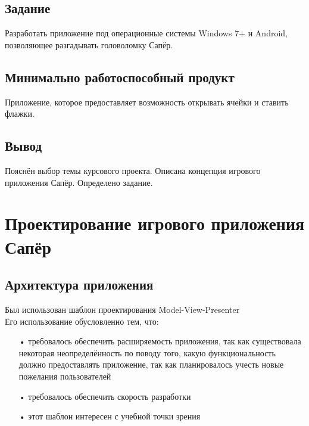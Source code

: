 \subsection{Задание}

Разработать приложение под операционные системы Windows 7+ и Android, позволяющее разгадывать головоломку Сапёр. 

\subsection{Минимально работоспособный продукт}

Приложение, которое предоставляет возможность открывать ячейки и ставить флажки.

\subsection{Вывод}

Пояснён выбор темы курсового проекта. Описана концепция игрового приложения Сапёр. Определено задание.


\section{Проектирование игрового приложения Сапёр}

\subsection{Архитектура приложения}

Был использован шаблон проектирования Model-View-Presenter\\

Его использование обусловленно тем, что:

\begin{enumerate}  
\item[•]  требовалось обеспечить расширяемость приложения, так как существовала некоторая неопределённость по поводу того, какую функциональность должно предоставлять приложение, так как планировалось учесть новые пожелания пользователей
\item[•]  требовалось обеспечить скорость разработки
\item[•]  этот шаблон интересен с учебной точки зрения
\end{enumerate}

